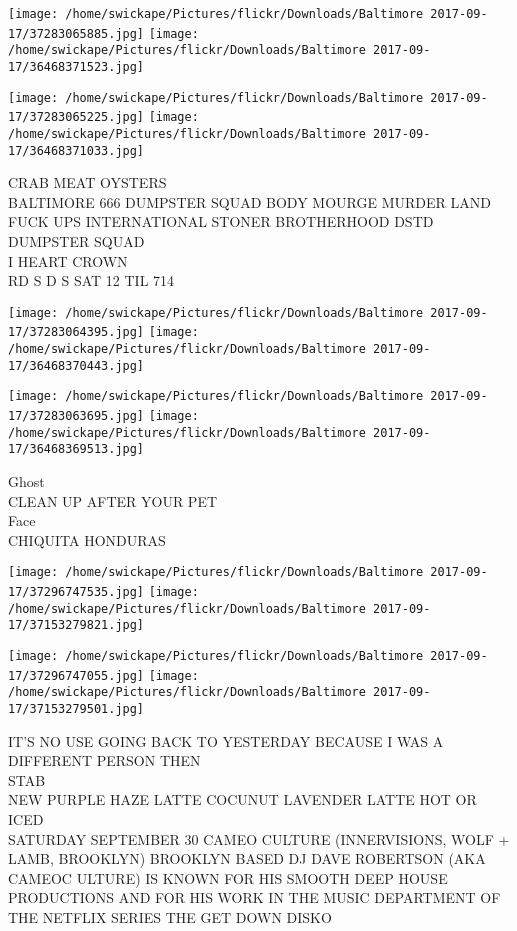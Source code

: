 \documentclass[10pt,letterpaper]{article}
\begin{document}
\texttt{[image: /home/swickape/Pictures/flickr/Downloads/Baltimore 2017-09-17/37283065885.jpg]}
\texttt{[image: /home/swickape/Pictures/flickr/Downloads/Baltimore 2017-09-17/36468371523.jpg]}

\texttt{[image: /home/swickape/Pictures/flickr/Downloads/Baltimore 2017-09-17/37283065225.jpg]}
\texttt{[image: /home/swickape/Pictures/flickr/Downloads/Baltimore 2017-09-17/36468371033.jpg]}

CRAB MEAT OYSTERS\\
BALTIMORE 666 DUMPSTER SQUAD BODY MOURGE MURDER LAND FUCK UPS INTERNATIONAL STONER BROTHERHOOD DSTD DUMPSTER SQUAD\\
I HEART CROWN\\
RD S D S SAT 12 TIL 714\\
\pagebreak

\texttt{[image: /home/swickape/Pictures/flickr/Downloads/Baltimore 2017-09-17/37283064395.jpg]}
\texttt{[image: /home/swickape/Pictures/flickr/Downloads/Baltimore 2017-09-17/36468370443.jpg]}

\texttt{[image: /home/swickape/Pictures/flickr/Downloads/Baltimore 2017-09-17/37283063695.jpg]}
\texttt{[image: /home/swickape/Pictures/flickr/Downloads/Baltimore 2017-09-17/36468369513.jpg]}

Ghost\\
CLEAN UP AFTER YOUR PET\\
Face\\
CHIQUITA HONDURAS\\
\pagebreak

\texttt{[image: /home/swickape/Pictures/flickr/Downloads/Baltimore 2017-09-17/37296747535.jpg]}
\texttt{[image: /home/swickape/Pictures/flickr/Downloads/Baltimore 2017-09-17/37153279821.jpg]}

\texttt{[image: /home/swickape/Pictures/flickr/Downloads/Baltimore 2017-09-17/37296747055.jpg]}
\texttt{[image: /home/swickape/Pictures/flickr/Downloads/Baltimore 2017-09-17/37153279501.jpg]}

IT'S NO USE GOING BACK TO YESTERDAY BECAUSE I WAS A DIFFERENT PERSON THEN\\
STAB\\
NEW PURPLE HAZE LATTE COCUNUT LAVENDER LATTE HOT OR ICED\\
SATURDAY SEPTEMBER 30 CAMEO CULTURE (INNERVISIONS, WOLF + LAMB, BROOKLYN) BROOKLYN BASED DJ DAVE ROBERTSON (AKA CAMEOC ULTURE) IS KNOWN FOR HIS SMOOTH DEEP HOUSE PRODUCTIONS AND FOR HIS WORK IN THE MUSIC DEPARTMENT OF THE NETFLIX SERIES THE GET DOWN DISKO\\
\pagebreak
\end{document}
